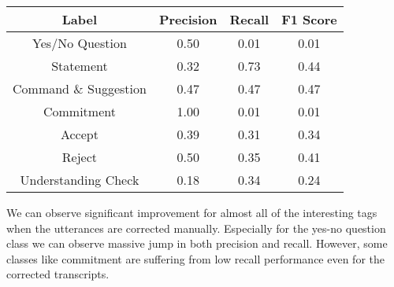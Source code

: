 \begin{center}
\begin{tabular}{||c c c c||}
 \hline
 Label & Precision & Recall & F1 Score\\ [0.5ex]
 \hline\hline
 Yes/No Question & 0.50 & 0.01 & 0.01\\
 \hline
 Statement & 0.32 & 0.73 & 0.44\\
 \hline
 Command \& Suggestion & 0.47 & 0.47 & 0.47\\
 \hline
 Commitment & 1.00 & 0.01 & 0.01\\
 \hline
 Accept & 0.39 & 0.31 &  0.34 \\
 \hline
  Reject & 0.50 & 0.35 & 0.41\\
 \hline
  Understanding Check & 0.18 & 0.34 & 0.24\\
 \hline
\end{tabular}
\end{center}

We can observe significant improvement for almost all of the interesting tags when the
utterances are corrected manually. Especially for the yes-no question class we can 
observe massive jump in both precision and recall. However, some classes like commitment
are suffering from low recall performance even for the corrected transcripts. 


